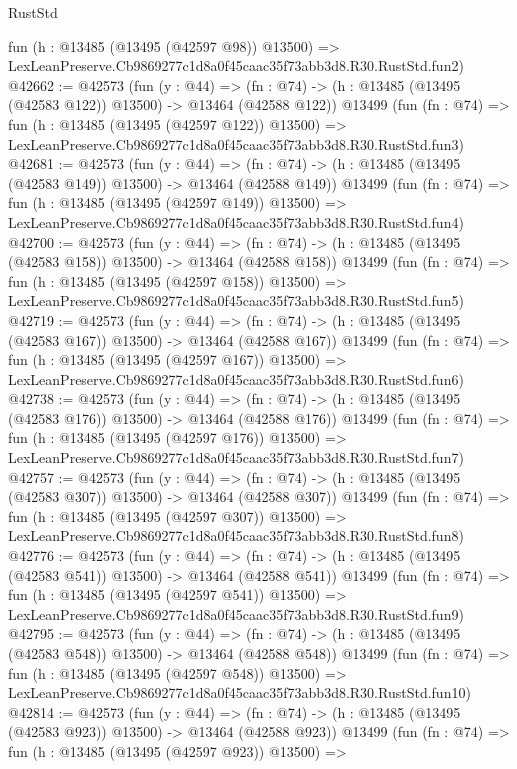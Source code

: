 \begin{lexlean}{RustStd}
\begin{coremodule}
    fun (h : @13485 (@13495 (@42597 @98)) @13500) =>
    LexLeanPreserve.Cb9869277c1d8a0f45caac35f73abb3d8.R30.RustStd.fun2)
@42662 := @42573
    (fun (y : @44) =>
    (fn : @74) -> (h : @13485 (@13495 (@42583 @122)) @13500) -> @13464 (@42588 @122))
    @13499
    (fun (fn : @74) =>
    fun (h : @13485 (@13495 (@42597 @122)) @13500) =>
    LexLeanPreserve.Cb9869277c1d8a0f45caac35f73abb3d8.R30.RustStd.fun3)
@42681 := @42573
    (fun (y : @44) =>
    (fn : @74) -> (h : @13485 (@13495 (@42583 @149)) @13500) -> @13464 (@42588 @149))
    @13499
    (fun (fn : @74) =>
    fun (h : @13485 (@13495 (@42597 @149)) @13500) =>
    LexLeanPreserve.Cb9869277c1d8a0f45caac35f73abb3d8.R30.RustStd.fun4)
@42700 := @42573
    (fun (y : @44) =>
    (fn : @74) -> (h : @13485 (@13495 (@42583 @158)) @13500) -> @13464 (@42588 @158))
    @13499
    (fun (fn : @74) =>
    fun (h : @13485 (@13495 (@42597 @158)) @13500) =>
    LexLeanPreserve.Cb9869277c1d8a0f45caac35f73abb3d8.R30.RustStd.fun5)
@42719 := @42573
    (fun (y : @44) =>
    (fn : @74) -> (h : @13485 (@13495 (@42583 @167)) @13500) -> @13464 (@42588 @167))
    @13499
    (fun (fn : @74) =>
    fun (h : @13485 (@13495 (@42597 @167)) @13500) =>
    LexLeanPreserve.Cb9869277c1d8a0f45caac35f73abb3d8.R30.RustStd.fun6)
@42738 := @42573
    (fun (y : @44) =>
    (fn : @74) -> (h : @13485 (@13495 (@42583 @176)) @13500) -> @13464 (@42588 @176))
    @13499
    (fun (fn : @74) =>
    fun (h : @13485 (@13495 (@42597 @176)) @13500) =>
    LexLeanPreserve.Cb9869277c1d8a0f45caac35f73abb3d8.R30.RustStd.fun7)
@42757 := @42573
    (fun (y : @44) =>
    (fn : @74) -> (h : @13485 (@13495 (@42583 @307)) @13500) -> @13464 (@42588 @307))
    @13499
    (fun (fn : @74) =>
    fun (h : @13485 (@13495 (@42597 @307)) @13500) =>
    LexLeanPreserve.Cb9869277c1d8a0f45caac35f73abb3d8.R30.RustStd.fun8)
@42776 := @42573
    (fun (y : @44) =>
    (fn : @74) -> (h : @13485 (@13495 (@42583 @541)) @13500) -> @13464 (@42588 @541))
    @13499
    (fun (fn : @74) =>
    fun (h : @13485 (@13495 (@42597 @541)) @13500) =>
    LexLeanPreserve.Cb9869277c1d8a0f45caac35f73abb3d8.R30.RustStd.fun9)
@42795 := @42573
    (fun (y : @44) =>
    (fn : @74) -> (h : @13485 (@13495 (@42583 @548)) @13500) -> @13464 (@42588 @548))
    @13499
    (fun (fn : @74) =>
    fun (h : @13485 (@13495 (@42597 @548)) @13500) =>
    LexLeanPreserve.Cb9869277c1d8a0f45caac35f73abb3d8.R30.RustStd.fun10)
@42814 := @42573
    (fun (y : @44) =>
    (fn : @74) -> (h : @13485 (@13495 (@42583 @923)) @13500) -> @13464 (@42588 @923))
    @13499
    (fun (fn : @74) =>
    fun (h : @13485 (@13495 (@42597 @923)) @13500) =>

\end{coremodule}
\end{lexlean}
